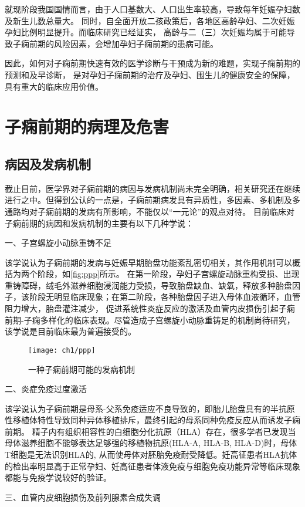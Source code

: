 就现阶段我国国情而言，由于人口基数大、人口出生率较高，导致每年妊娠孕妇数及新生儿数总量大。
同时，自全面开放二孩政策后，各地区高龄孕妇、二次妊娠孕妇比例明显提升。而临床研究已经证实，
高龄与二（三）次妊娠均属于可能导致子痫前期的风险因素，会增加孕妇子痫前期的患病可能。

因此，如何对子痫前期快速有效的医学诊断与干预成为新的难题，实现子痫前期的预测和及早诊断，
是对孕妇子痫前期的治疗及孕妇、围生儿的健康安全的保障，具有重大的临床应用价值。
\section{子痫前期的病理及危害}
\subsection{病因及发病机制}
截止目前，医学界对子痫前期的病因与发病机制尚未完全明确，相关研究还在继续进行之中。但得到公认的一点是，子痫前期病发具有异质性，多因素、多机制及多通路均对子痫前期的发病有所影响，不能仅以“一元论”的观点对待。
目前临床对子痫前期的病因和发病机制的主要有以下几种学说：

一、子宫螺旋小动脉重铸不足

该学说认为子痫前期的发病与妊娠早期胎盘功能紊乱密切相关\cite{OAG9,Duvekot2010}，其作用机制可以概括为两个阶段，如\autoref{fig:ppp}所示。
在第一阶段，孕妇子宫螺旋动脉重构受损、出现重铸障碍，绒毛外滋养细胞浸润能力受损，导致胎盘缺血、缺氧，释放多种胎盘因子，该阶段无明显临床现象；在第二阶段，各种胎盘因子进入母体血液循环，血管阻力增大，胎盘灌注减少，
促进系统性炎症反应的激活及血管内皮损伤引起子痫前期-子痫多样化的临床表现。尽管造成子宫螺旋小动脉重铸足的机制尚待研究，该学说是目前临床最为普遍接受的。
\begin{figure}[htbp]
    \centering
    \texttt{[image: ch1/ppp]}
    \caption{\label{fig:ppp}一种子痫前期可能的发病机制}
\end{figure}

二、炎症免疫过度激活

该学说认为子痫前期是母系-父系免疫适应不良导致的\cite{Sibai2005,OAG9,Shi2006}，即胎儿胎盘具有的半抗原性移植体特性导致同种异体移植排斥，最终引起的母系同种免疫反应从而诱发子痫前期。
精子内有组织相容性的白细胞分化抗原（HLA）存在，很多学者已发现当母体滋养细胞不能够表达足够强的移植物抗原(HLA-A, HLA-B, HLA-D)\cite{Moffett2002}时，母体T细胞是无法识别HLA的,
从而使母体对胚胎免疫耐受降低。妊高征患者HLA抗体的检出率明显高于正常孕妇、妊高征患者体液免疫与细胞免疫功能异常等临床现象都能与免疫学说较好的验证。

三、血管内皮细胞损伤及前列腺素合成失调

